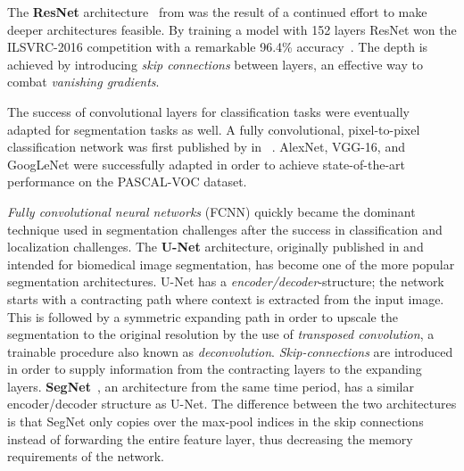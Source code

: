 The \textbf{ResNet} architecture~\cite{resnet} from \citeyear{resnet} was the result of a continued effort to make deeper architectures feasible.
By training a model with 152 layers ResNet won the ILSVRC-2016 competition with a remarkable 96.4\% accuracy~\cite{segmentation-overview}.
The depth is achieved by introducing \textit{skip connections} between layers, an effective way to combat \textit{vanishing gradients}.

The success of convolutional layers for classification tasks were eventually adapted for segmentation tasks as well.
A fully convolutional, pixel-to-pixel classification network was first published by \citeauthor{segmentation-fcnn} in \citeyear{segmentation-fcnn}~\cite{segmentation-fcnn}.
AlexNet, VGG-16, and GoogLeNet were successfully adapted in order to achieve state-of-the-art performance on the PASCAL-VOC dataset.

\textit{Fully convolutional neural networks} (FCNN) quickly became the dominant technique used in segmentation challenges after the success in classification and localization challenges.
The \textbf{U-Net} architecture, originally published in \citeyear{segmentation-unet} and intended for biomedical image segmentation, has become one of the more popular segmentation architectures.
U-Net has a \textit{encoder/decoder}-structure; the network starts with a contracting path where context is extracted from the input image.
This is followed by a symmetric expanding path in order to upscale the segmentation to the original resolution by the use of \textit{transposed convolution}, a trainable procedure also known as \textit{deconvolution}.
\textit{Skip-connections} are introduced in order to supply information from the contracting layers to the expanding layers.
\textbf{SegNet}~\cite{segmentation-segnet}, an architecture from the same time period, has a similar encoder/decoder structure as U-Net.
The difference between the two architectures is that SegNet only copies over the max-pool indices in the skip connections instead of forwarding the entire feature layer, thus decreasing the memory requirements of the network.

